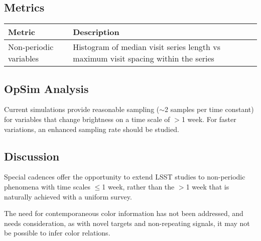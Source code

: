 \subsection{Metrics}
\label{sec:\secname:metrics}

\begin{center}
\begin{tabular}{| p{5cm} |p{10cm} |}
\hline Metric & Description\\
\hline
Non-periodic variables & Histogram of median visit series length vs maximum visit spacing within the series\\
  \hline \end{tabular}
 \end{center}



\subsection{OpSim Analysis}
\label{sec:\secname:analysis}

Current simulations provide reasonable sampling ($\sim$2 samples per time constant) for variables that change brightness on a time scale of $>$1 week.  For faster variations, an enhanced sampling rate should be studied.



\subsection{Discussion}
\label{sec:\secname:discussion}

Special cadences offer the opportunity to extend LSST studies to non-periodic phenomena with time scales $\leq$1 week, rather than the $>$1 week that is naturally achieved with a uniform survey.


The need for contemporaneous color information has not been addressed, and needs consideration, as with novel targets and non-repeating signals, it may not be possible to infer color relations.

\navigationbar
